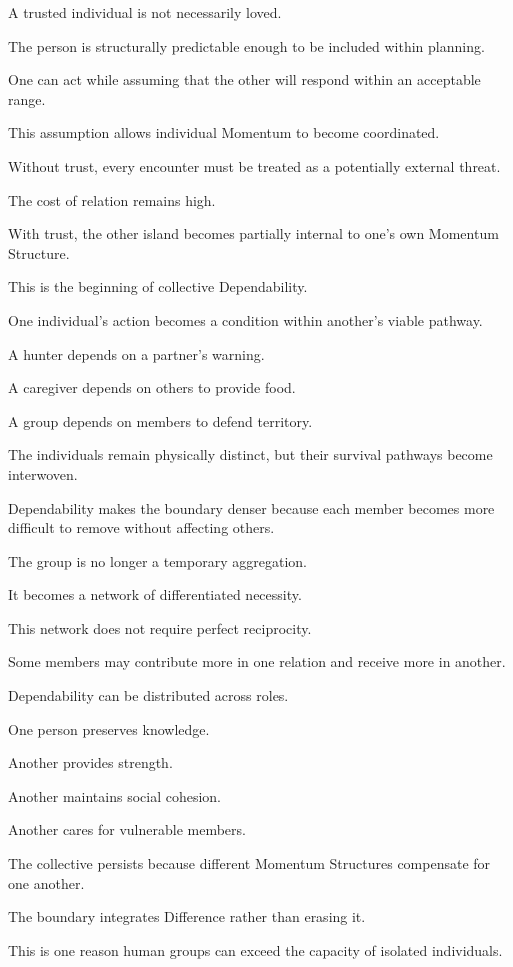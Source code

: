 A trusted individual is not necessarily loved.

The person is structurally predictable enough to be included within planning.

One can act while assuming that the other will respond within an acceptable range.

This assumption allows individual Momentum to become coordinated.

Without trust, every encounter must be treated as a potentially external threat.

The cost of relation remains high.

With trust, the other island becomes partially internal to one’s own Momentum Structure.

This is the beginning of collective Dependability.

One individual’s action becomes a condition within another’s viable pathway.

A hunter depends on a partner’s warning.

A caregiver depends on others to provide food.

A group depends on members to defend territory.

The individuals remain physically distinct, but their survival pathways become interwoven.

Dependability makes the boundary denser because each member becomes more difficult to remove without affecting others.

The group is no longer a temporary aggregation.

It becomes a network of differentiated necessity.

This network does not require perfect reciprocity.

Some members may contribute more in one relation and receive more in another.

Dependability can be distributed across roles.

One person preserves knowledge.

Another provides strength.

Another maintains social cohesion.

Another cares for vulnerable members.

The collective persists because different Momentum Structures compensate for one another.

The boundary integrates Difference rather than erasing it.

This is one reason human groups can exceed the capacity of isolated individuals.

